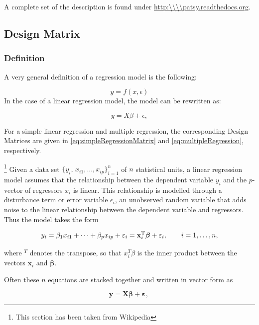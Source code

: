 A complete set of the description is found under \url{http:\\\\patsy.readthedocs.org}.

\subsection{Design Matrix}

\subsubsection{Definition}
A very general definition of a regression model is the following:

\begin{equation}
  y =f(x,\epsilon)
\end{equation}
In the case of a linear regression model, the model can be rewritten as:

\begin{equation*}
    y=X\beta+ \epsilon,
\end{equation*}

For a simple linear regression and multiple regression, the corresponding Design Matrices are given in \ref{eq:simpleRegressionMatrix} and \ref{eq:multipleRegression}, respectively.

\footnote{This section has been taken from Wikipedia} Given a data set $\{y_i,\, x_{i1}, \ldots, x_{ip}\}_{i=1}^n$ of $n$ statistical units, a linear regression model assumes that the relationship between the dependent variable $y_i$ and the $p$-vector of regressors $x_i$ is linear. This relationship is modelled through a disturbance term or error variable $\epsilon_i$, an unobserved random variable that adds noise to the linear relationship between the dependent variable and regressors. Thus the model takes the form

\begin{equation}\label{eq:regression}
   y_i = \beta_1   x_{i1} + \cdots + \beta_p x_{ip} + \varepsilon_i
   = \mathbf{x}^{\rm T}_i\boldsymbol\beta + \varepsilon_i,
   \qquad i = 1, \ldots, n,
\end{equation}

where $^T$ denotes the transpose, so that $x_i^T\beta$ is the inner product between the vectors $\mathbf{x}_i$ and $\boldsymbol\beta$.

Often these $n$ equations are stacked together and written in vector form as

\begin{equation}
  \mathbf{y} = \mathbf{X}\boldsymbol\beta + \boldsymbol\varepsilon, \,
\end{equation}

